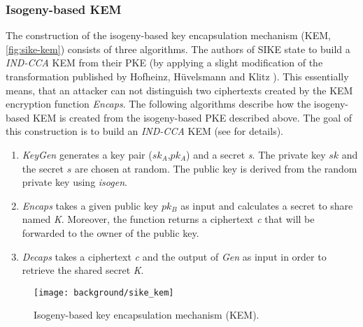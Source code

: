 \subsubsection{Isogeny-based \gls{KEM}}
The construction of the isogeny-based key encapsulation mechanism (\gls{KEM}, \autoref{fig:sike-kem}) consists of three algorithms. The authors of \gls{SIKE} state to build a \textit{IND-CCA} \gls{KEM} from their \gls{PKE} \parencite{sike2020spec} (by applying a slight modification of the transformation published by Hofheinz, Hüvelsmann and Klitz \parencite{cryptoeprint:2017:604}). This essentially means, that an attacker can not distinguish two ciphertexts created by the \gls{KEM} encryption function \textit{Encaps}. The following algorithms describe how the isogeny-based \gls{KEM} is created from the isogeny-based \gls{PKE} described above. The goal of this construction is to build an \textit{IND-CCA} \gls{KEM} (see \parencite{cryptoeprint:2017:604} for details).
\begin{enumerate}
\item \textit{KeyGen} generates a key pair ($sk_A$,$pk_A$) and a secret \textit{s}. The private key $sk$ and the secret $s$ are chosen at random. The public key is derived from the random private key using \textit{isogen}.
\item \textit{Encaps} takes a given public key $pk_B$ as input and calculates a secret to share named \textit{K}. Moreover, the function returns a ciphertext \textit{c} that will be forwarded to the owner of the public key.
\item \textit{Decaps} takes a ciphertext \textit{c} and the output of \textit{Gen} as input in order to retrieve the shared secret \textit{K}.
\end{enumerate}
\begin{figure}[H]
  \centering
  \texttt{[image: background/sike\_kem]}
  \caption[Isogeny-based \gls{KEM}]
  {Isogeny-based key encapsulation mechanism (\gls{KEM}).} \label{fig:sike-kem}
\end{figure}
